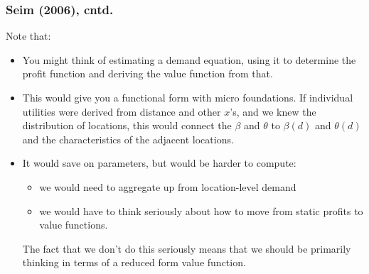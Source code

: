 \documentclass[notes=show]{beamer}
\begin{document}
\begin{frame}%

\frametitle{Seim (2006), cntd.}

Note that:

\begin{itemize}
\item You might think of estimating a demand equation, using it to determine
the profit function and deriving the value function from that.

\item This would give you a functional form with micro foundations. If
individual utilities were derived from distance and other $x$'s, and we knew
the distribution of locations, this would connect the $\beta $ and $\theta $
to $\beta (d)$ and $\theta (d)$ and the characteristics of the adjacent
locations.

\item It would save on parameters, but would be harder to compute:

\begin{itemize}
\item we would need to aggregate up from location-level demand

\item we would have to think seriously about how to move from static profits
to value functions.
\end{itemize}

The fact that we don't do this seriously means that we should be primarily
thinking in terms of a reduced form value function.
\end{itemize}

\end{frame}%
\end{document}
